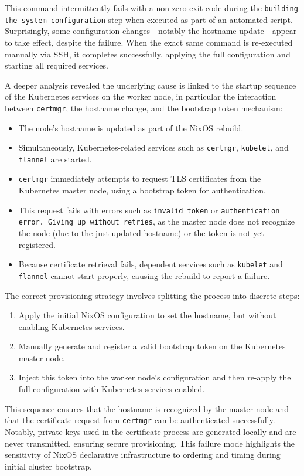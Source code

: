This command intermittently fails with a non-zero exit code during the \texttt{building the system configuration} step when executed as part of an automated script. Surprisingly, some configuration changes---notably the hostname update---appear to take effect, despite the failure. When the exact same command is re-executed manually via SSH, it completes successfully, applying the full configuration and starting all required services.

A deeper analysis revealed the underlying cause is linked to the startup sequence of the Kubernetes services on the worker node, in particular the interaction between \texttt{certmgr}, the hostname change, and the bootstrap token mechanism:

\begin{itemize}
    \item The node's hostname is updated as part of the NixOS rebuild.
    \item Simultaneously, Kubernetes-related services such as \texttt{certmgr}, \texttt{kubelet}, and \texttt{flannel} are started.
    \item \texttt{certmgr} immediately attempts to request TLS certificates from the Kubernetes master node, using a bootstrap token for authentication.
    \item This request fails with errors such as \texttt{invalid token} or \texttt{authentication error. Giving up without retries}, as the master node does not recognize the node (due to the just-updated hostname) or the token is not yet registered.
    \item Because certificate retrieval fails, dependent services such as \texttt{kubelet} and \texttt{flannel} cannot start properly, causing the rebuild to report a failure.
\end{itemize}

The correct provisioning strategy involves splitting the process into discrete steps:

\begin{enumerate}
    \item Apply the initial NixOS configuration to set the hostname, but without enabling Kubernetes services.
    \item Manually generate and register a valid bootstrap token on the Kubernetes master node.
    \item Inject this token into the worker node's configuration and then re-apply the full configuration with Kubernetes services enabled.
\end{enumerate}

This sequence ensures that the hostname is recognized by the master node and that the certificate request from \texttt{certmgr} can be authenticated successfully. Notably, private keys used in the certificate process are generated locally and are never transmitted, ensuring secure provisioning. This failure mode highlights the sensitivity of NixOS declarative infrastructure to ordering and timing during initial cluster bootstrap.